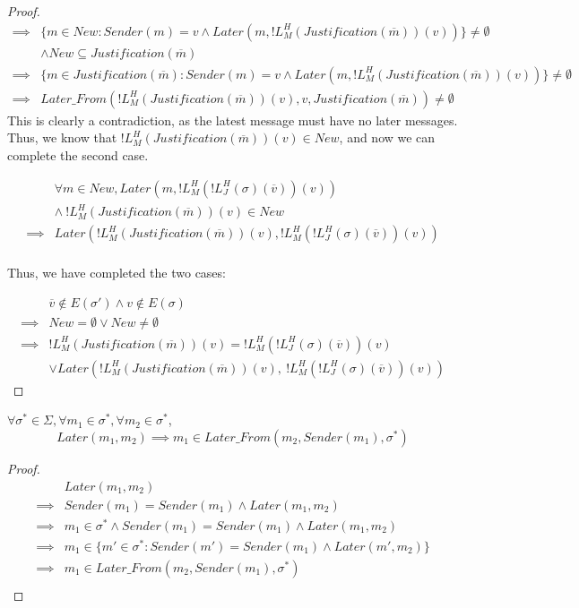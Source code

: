 \begin{proof}
\begin{align}
  \implies&\{m \in New : Sender(m) = v \land Later(m, !L^H_M(Justification(\overline{m}))(v))\} \neq \emptyset \\
          &\land New \subseteq Justification(\overline{m}) \\
  \implies&\{m \in Justification(\overline{m}) : Sender(m) = v \land Later(m, !L^H_M(Justification(\overline{m}))(v))\} \neq \emptyset \\
  \implies&Later\_From(!L^H_M(Justification(\overline{m}))(v), v, Justification(\overline{m})) \neq \emptyset
\end{align}
This is clearly a contradiction, as the latest message must have no later messages. Thus, we know that $!L^H_M(Justification(\overline{m}))(v) \in New$, and now we can complete the second case.

\begin{align}
          &\forall m \in New, Later(m, !L^H_M(!L^H_J(\sigma)(\overline{v}))(v)) \\
          &\land ~!L^H_M(Justification(\overline{m}))(v) \in New \\
  \implies& Later(!L^H_M(Justification(\overline{m}))(v), !L^H_M(!L^H_J(\sigma)(\overline{v}))(v))\\
\end{align}

Thus, we have completed the two cases:

\begin{align}
        &\overline{v} \notin E(\sigma') \land v \notin E(\sigma) \\
\implies& New = \emptyset \lor New \neq \emptyset \\
\implies& !L^H_M(Justification(\overline{m}))(v) = !L^H_M(!L^H_J(\sigma)(\overline{v}))(v) \\
        &\lor Later(!L^H_M(Justification(\overline{m}))(v),~!L^H_M(!L^H_J(\sigma)(\overline{v}))(v))
\end{align}

\end{proof}


\begin{lemma}
$\forall \sigma^* \in \Sigma, \forall m_1 \in \sigma^*, \forall m_2 \in \sigma^*$,
$$
Later(m_1, m_2) \implies m_1 \in Later\_From(m_2, Sender(m_1), \sigma^*)
$$
\end{lemma}

\begin{proof}
\begin{align}
          &Later(m_1, m_2) \\
  \implies& Sender(m_1) = Sender(m_1) \land Later(m_1, m_2) \\
  \implies& m_1 \in \sigma^* \land Sender(m_1) = Sender(m_1) \land Later(m_1, m_2) \\
  \implies& m_1 \in \{m' \in \sigma^* : Sender(m') = Sender(m_1) \land Later(m', m_2)\} \\
  \implies& m_1 \in Later\_From(m_2, Sender(m_1), \sigma^*) \\
\end{align}
\end{proof}


